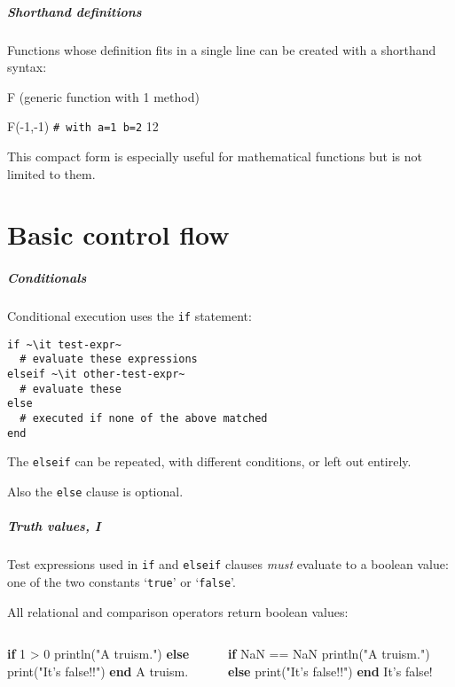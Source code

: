 \documentclass[english,serif,mathserif,xcolor=pdftex,dvipsnames,table]{beamer}
\begin{document}
\begin{frame}[fragile]
  \frametitle{Shorthand definitions}
  Functions whose definition fits in a single line can be created with
  a shorthand syntax:
\begin{semiverbatim}
\julia {}
F (generic function with 1 method)

\julia F(-1,-1)  \lstinline|# with a=1 b=2|
12
\end{semiverbatim}

  \+ This compact form is especially useful for mathematical functions
  but is not limited to them.
\end{frame}


\part{Basic control flow}
\begin{frame}[fragile]
  \frametitle{Conditionals}
  Conditional execution uses the \texttt{if} statement:
\begin{lstlisting}
if ~\it test-expr~
  # evaluate these expressions
elseif ~\it other-test-expr~
  # evaluate these
else
  # executed if none of the above matched
end
\end{lstlisting}

  \+The \texttt{elseif} can be repeated, with different conditions, or
  left out entirely.

  \+
  Also the \texttt{else} clause is optional.
\end{frame}


\begin{frame}[fragile]
  \frametitle{Truth values, I}
  \small

  Test expressions used in \texttt{if} and \texttt{elseif} clauses
  \emph{must} evaluate to a boolean value: one of the two constants
  `\texttt{true}' or `\texttt{false}'.

  \+
  All relational and comparison operators return boolean values:
  \begin{columns}
    \begin{column}{0.5\textwidth}
\begin{semiverbatim}
\julia \textbf{if} 1 > 0
    println("A truism.")
  \textbf{else}
    print("It's false!!")
  \textbf{end}
A truism.
\end{semiverbatim}
    \end{column}
    \begin{column}{0.5\textwidth}
\begin{semiverbatim}
\julia \textbf{if} NaN == NaN
    println("A truism.")
  \textbf{else}
    print("It's false!!")
  \textbf{end}
It's false!
\end{semiverbatim}
    \end{column}
  \end{columns}
\end{frame}
\end{document}
